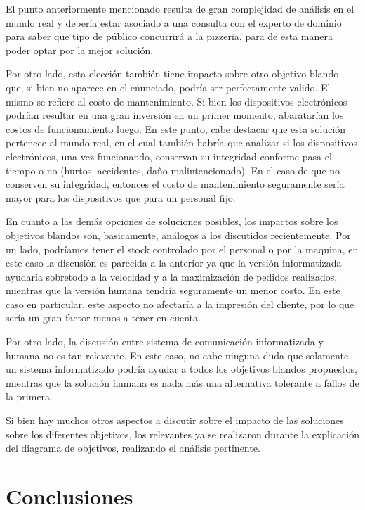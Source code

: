 \documentclass[a4paper,10pt]{article}
\begin{document}
El punto anteriormente mencionado resulta de gran complejidad de an\'alisis en el mundo real y deber\'ia estar asociado a una consulta con el
experto de dominio para saber que tipo de p\'ublico concurrir\'a a la pizzeria, para de esta manera poder optar por la mejor soluci\'on.

Por otro lado, esta elecci\'on tambi\'en tiene impacto sobre otro objetivo blando que, si bien no aparece en el enunciado, podr\'ia ser perfectamente valido.
El mismo se refiere al costo de mantenimiento. Si bien los dispositivos electr\'onicos podr\'ian resultar en una gran inversi\'on en un primer momento,
abaratar\'ian los costos de funcionamiento luego. En este punto, cabe destacar que esta soluci\'on pertenece al mundo real, en el cual tambi\'en
habr\'ia que analizar si los dispositivos electr\'onicos, una vez funcionando, conservan su integridad conforme pasa el tiempo o no (hurtos, accidentes, da\~{n}o malintencionado).
En el caso de que no conserven su integridad, entonces el costo de mantenimiento seguramente ser\'ia mayor para los dispositivos que para un personal fijo.

\medskip

En cuanto a las dem\'as opciones de soluciones posibles, los impactos sobre los objetivos blandos son, basicamente, an\'alogos a los discutidos
recientemente. Por un lado, podr\'iamos tener el stock controlado por el personal o por la maquina, en este caso la discusi\'on es parecida a la anterior
ya que la versi\'on informatizada ayudar\'ia sobretodo a la velocidad y a la maximizaci\'on de pedidos realizados, mientras que la versi\'on humana
tendr\'ia seguramente un menor costo. En este caso en particular, este aspecto no afectar\'ia a la impresi\'on del cliente, por lo que ser\'ia un
gran factor menos a tener en cuenta.

Por otro lado, la discusi\'on entre sistema de comunicaci\'on informatizada y humana no es tan relevante. En este caso, no cabe ninguna duda que 
solamente un sistema informatizado podr\'ia ayudar a todos los objetivos blandos propuestos, mientras que la soluci\'on humana es nada m\'as una alternativa
tolerante a fallos de la primera.
\medskip

Si bien hay muchos otros aspectos a discutir sobre el impacto de las soluciones sobre los diferentes objetivos, los relevantes ya se realizaron
durante la explicaci\'on del diagrama de objetivos, realizando el an\'alisis pertinente.
 

\newpage
\section*{Conclusiones}
\end{document}
